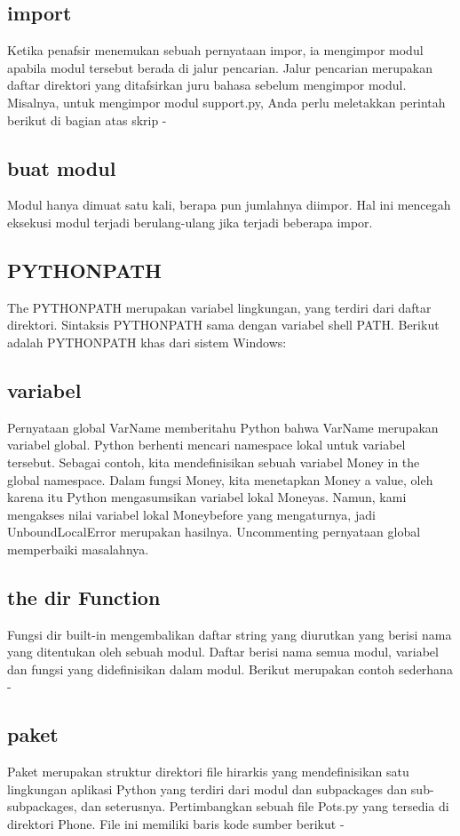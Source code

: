 \subsection{import}
Ketika penafsir menemukan sebuah pernyataan impor, ia mengimpor modul apabila modul tersebut berada di jalur pencarian. Jalur pencarian merupakan daftar direktori yang ditafsirkan juru bahasa sebelum mengimpor modul. Misalnya, untuk mengimpor modul support.py, Anda perlu meletakkan perintah berikut di bagian atas skrip - 
 
\subsection{buat modul}Modul hanya dimuat satu kali, berapa pun jumlahnya diimpor. Hal ini mencegah eksekusi modul terjadi berulang-ulang jika terjadi beberapa impor.
 

\subsection{PYTHONPATH} 
The PYTHONPATH merupakan variabel lingkungan, yang terdiri dari daftar direktori. Sintaksis PYTHONPATH sama dengan variabel shell PATH. 
Berikut adalah PYTHONPATH khas dari sistem Windows:
 
\subsection{variabel}
Pernyataan global VarName memberitahu Python bahwa VarName merupakan variabel global. Python berhenti mencari namespace lokal untuk variabel tersebut. 
Sebagai contoh, kita mendefinisikan sebuah variabel Money in the global namespace. Dalam fungsi Money, kita menetapkan Money a value, oleh karena itu Python mengasumsikan variabel lokal Moneyas. Namun, kami mengakses nilai variabel lokal Moneybefore yang mengaturnya, jadi UnboundLocalError merupakan hasilnya. Uncommenting pernyataan global memperbaiki masalahnya.
 
\subsection{the dir Function}
Fungsi dir built-in mengembalikan daftar string yang diurutkan yang berisi nama yang ditentukan oleh sebuah modul.
Daftar berisi nama semua modul, variabel dan fungsi yang didefinisikan dalam modul. Berikut merupakan contoh sederhana - 

\subsection{paket}
Paket merupakan struktur direktori file hirarkis yang mendefinisikan satu lingkungan aplikasi Python yang terdiri dari modul dan subpackages dan sub-subpackages, dan seterusnya.
Pertimbangkan sebuah file Pots.py yang tersedia di direktori Phone. File ini memiliki baris kode sumber berikut -

